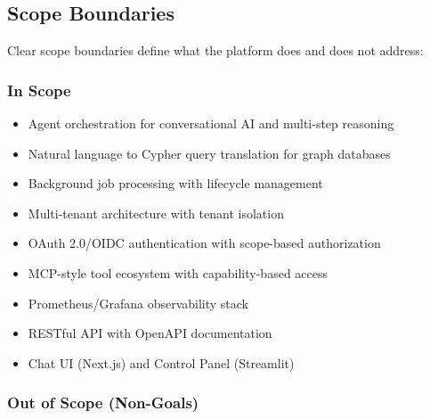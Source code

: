 \subsection{Scope Boundaries}
\label{subsec:scope-boundaries}

Clear scope boundaries define what the platform does and does not address:

\subsubsection{In Scope}

\begin{itemize}
    \item Agent orchestration for conversational AI and multi-step reasoning
    \item Natural language to Cypher query translation for graph databases
    \item Background job processing with lifecycle management
    \item Multi-tenant architecture with tenant isolation
    \item OAuth 2.0/OIDC authentication with scope-based authorization
    \item MCP-style tool ecosystem with capability-based access
    \item Prometheus/Grafana observability stack
    \item RESTful API with OpenAPI documentation
    \item Chat UI (Next.js) and Control Panel (Streamlit)
\end{itemize}

\subsubsection{Out of Scope (Non-Goals)}

